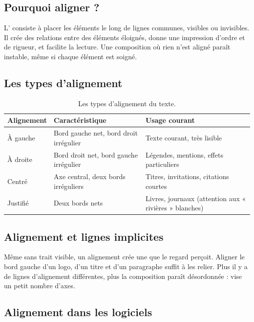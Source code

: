 \subsection{Pourquoi aligner ?}

L' consiste à placer les éléments le long de lignes communes, visibles ou invisibles. Il crée des relations entre des éléments éloignés, donne une impression d'ordre et de rigueur, et facilite la lecture. Une composition où rien n'est aligné paraît instable, même si chaque élément est soigné.

\subsection{Les types d'alignement}

\begin{table}[h!]
\centering
\begin{tabular}{@{}p{3.2cm}p{4.5cm}p{6.3cm}@{}}
\toprule
\textbf{Alignement} & \textbf{Caractéristique} & \textbf{Usage courant} \\
\midrule
À gauche & Bord gauche net, bord droit irrégulier & Texte courant, très lisible \\
À droite & Bord droit net, bord gauche irrégulier & Légendes, mentions, effets particuliers \\
Centré & Axe central, deux bords irréguliers & Titres, invitations, citations courtes \\
Justifié & Deux bords nets & Livres, journaux (attention aux « rivières » blanches) \\
\bottomrule
\end{tabular}
\caption{Les types d'alignement du texte.}
\end{table}

\subsection{Alignement et lignes implicites}

Même sans trait visible, un alignement crée une  que le regard perçoit. Aligner le bord gauche d'un logo, d'un titre et d'un paragraphe suffit à les relier. Plus il y a de lignes d'alignement différentes, plus la composition paraît désordonnée : vise un petit nombre d'axes.

\subsection{Alignement dans les logiciels}

